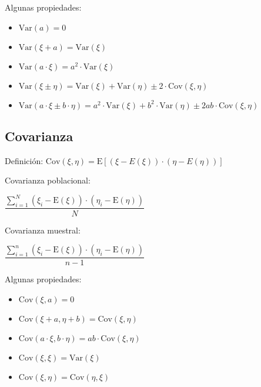 \documentclass[10pt, a4paper, landscape]{extarticle}
\newcommand{\E}{\mathrm{E}}
\newcommand{\Var}{\mathrm{Var}}
\newcommand{\Cov}{\mathrm{Cov}}
\begin{document}
\begin{multicols}{3}
Algunas propiedades:

\begin{itemize}[leftmargin=*]
	\item $\Var(a) = 0$
	\item $\Var(\xi + a) = \Var(\xi)$
	\item $\Var(a \cdot \xi) = a^2 \cdot \Var(\xi)$
	\item $\Var(\xi \pm \eta) = \Var(\xi) + \Var(\eta) \pm 2 \cdot \Cov(\xi, \eta)$
	\item $\Var(a \cdot \xi \pm b \cdot \eta) = a^2 \cdot \Var(\xi) + b^2 \cdot \Var(\eta) \pm 2 a b \cdot \Cov(\xi, \eta)$
\end{itemize}

\subsection*{Covarianza}

Definición: \quad $\Cov(\xi, \eta) = \E[(\xi - E(\xi)) \cdot (\eta - E(\eta))]$

\begin{multicols}{2}
	Covarianza poblacional:
	\begin{center}
		$\dfrac{\sum_{i=1}^{N} (\xi_i - \E(\xi)) \cdot (\eta_i - \E(\eta))}{N}$
	\end{center}
\columnbreak
	Covarianza muestral:
	\begin{center}
		$\dfrac{\sum_{i=1}^{n} (\xi_i - \E(\xi)) \cdot (\eta_i - \E(\eta))}{n - 1}$
	\end{center}
\end{multicols}

Algunas propiedades:

\begin{itemize}[leftmargin=*]
	\item $\Cov(\xi, a) = 0$
	\item $\Cov(\xi + a, \eta + b) = \Cov(\xi, \eta)$
	\item $\Cov(a \cdot \xi, b \cdot \eta) = a b \cdot \Cov(\xi, \eta)$
	\item $\Cov(\xi, \xi) = \Var(\xi)$
	\item $\Cov(\xi, \eta) = \Cov(\eta, \xi)$
\end{itemize}

\end{multicols}

\pagebreak
\end{document}
